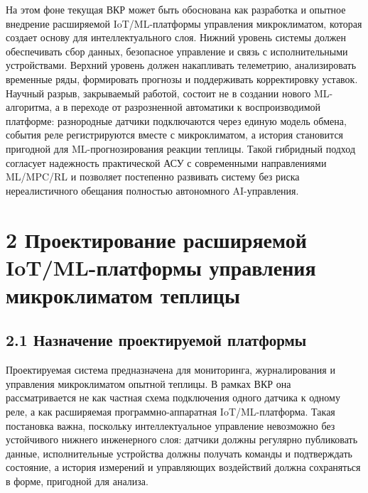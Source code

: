 \documentclass[a4paper,14pt]{extarticle}
\begin{document}
На этом фоне текущая ВКР может быть обоснована как разработка и опытное
внедрение расширяемой IoT/ML-платформы управления микроклиматом, которая
создает основу для интеллектуального слоя. Нижний уровень системы должен
обеспечивать сбор данных, безопасное управление и связь с
исполнительными устройствами. Верхний уровень должен накапливать
телеметрию, анализировать временные ряды, формировать прогнозы и
поддерживать корректировку уставок. Научный разрыв, закрываемый работой,
состоит не в создании нового ML-алгоритма, а в переходе от разрозненной
автоматики к воспроизводимой платформе: разнородные датчики подключаются
через единую модель обмена, события реле регистрируются вместе с
микроклиматом, а история становится пригодной для ML-прогнозирования
реакции теплицы. Такой гибридный подход согласует надежность
практической АСУ с современными направлениями ML/MPC/RL и позволяет
постепенно развивать систему без риска нереалистичного обещания
полностью автономного AI-управления.

\section{2 Проектирование расширяемой IoT/ML-платформы управления
микроклиматом
теплицы}\label{ux43fux440ux43eux435ux43aux442ux438ux440ux43eux432ux430ux43dux438ux435-ux440ux430ux441ux448ux438ux440ux44fux435ux43cux43eux439-iotml-ux43fux43bux430ux442ux444ux43eux440ux43cux44b-ux443ux43fux440ux430ux432ux43bux435ux43dux438ux44f-ux43cux438ux43aux440ux43eux43aux43bux438ux43cux430ux442ux43eux43c-ux442ux435ux43fux43bux438ux446ux44b}

\subsection{2.1 Назначение проектируемой
платформы}\label{ux43dux430ux437ux43dux430ux447ux435ux43dux438ux435-ux43fux440ux43eux435ux43aux442ux438ux440ux443ux435ux43cux43eux439-ux43fux43bux430ux442ux444ux43eux440ux43cux44b}

Проектируемая система предназначена для мониторинга, журналирования и
управления микроклиматом опытной теплицы. В рамках ВКР она
рассматривается не как частная схема подключения одного датчика к одному
реле, а как расширяемая программно-аппаратная IoT/ML-платформа. Такая
постановка важна, поскольку интеллектуальное управление невозможно без
устойчивого нижнего инженерного слоя: датчики должны регулярно
публиковать данные, исполнительные устройства должны получать команды и
подтверждать состояние, а история измерений и управляющих воздействий
должна сохраняться в форме, пригодной для анализа.
\end{document}
